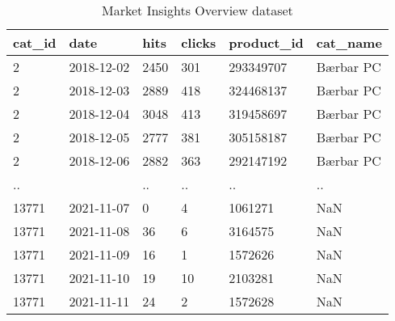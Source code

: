 \begin{table}[htbp]
   \centering
   \caption{Market Insights Overview dataset}
   \label{table:market_insights_overview_11-12-21}
   \begin{tabular}{llllll}
      \toprule
      cat\_id & date       & hits & clicks & product\_id & cat\_name \\
      \midrule
      2       & 2018-12-02 & 2450 & 301    & 293349707   & Bærbar PC \\
      2       & 2018-12-03 & 2889 & 418    & 324468137   & Bærbar PC \\
      2       & 2018-12-04 & 3048 & 413    & 319458697   & Bærbar PC \\
      2       & 2018-12-05 & 2777 & 381    & 305158187   & Bærbar PC \\
      2       & 2018-12-06 & 2882 & 363    & 292147192   & Bærbar PC \\
      ..      &            & ..   & ..     & ..          & ..        \\
      13771   & 2021-11-07 & 0    & 4      & 1061271     & NaN       \\
      13771   & 2021-11-08 & 36   & 6      & 3164575     & NaN       \\
      13771   & 2021-11-09 & 16   & 1      & 1572626     & NaN       \\
      13771   & 2021-11-10 & 19   & 10     & 2103281     & NaN       \\
      13771   & 2021-11-11 & 24   & 2      & 1572628     & NaN       \\
      \bottomrule
   \end{tabular}
\end{table}
